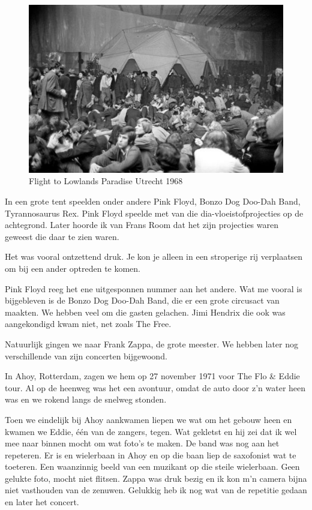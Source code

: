 \documentclass[12pt,twoside, openright]{memoir}
\begin{document}
\begin{figure}
\centering
\includegraphics[width=\textwidth]{img/181-flightutrecht}
\caption*{\footnotesize Flight to Lowlands Paradise Utrecht 1968}
\end{figure}

In een grote tent speelden onder andere Pink Floyd, Bonzo Dog Doo-Dah Band, Tyrannosaurus Rex. Pink Floyd speelde met van die dia-vloeistofprojecties op de achtegrond. Later hoorde ik van Frans Room dat het zijn projecties waren geweest die daar te zien waren.

Het was vooral ontzettend druk. Je kon je alleen in een stroperige rij verplaatsen om bij een ander optreden te komen. 

Pink Floyd reeg het ene uitgesponnen nummer aan het andere. Wat me vooral is bijgebleven is de Bonzo Dog Doo-Dah Band, die er een grote circusact van maakten. We hebben veel om die gasten gelachen. Jimi Hendrix die ook was aangekondigd kwam niet, net zoals The Free.

Natuurlijk gingen we naar Frank Zappa, de grote meester. We hebben later nog verschillende van zijn concerten bijgewoond.

In Ahoy, Rotterdam, zagen we hem op 27 november 1971 voor The Flo \& Eddie tour. Al op de heenweg was het een avontuur, omdat de auto door z’n water heen was en we rokend langs de snelweg stonden. 

Toen we eindelijk bij Ahoy aankwamen liepen we wat om het gebouw heen en kwamen we Eddie, één van de zangers, tegen. Wat gekletst en hij zei dat ik wel mee naar binnen mocht om wat foto's te maken. De band was nog aan het repeteren. Er is en wielerbaan in Ahoy en op die baan liep de saxofonist wat te toeteren. Een waanzinnig beeld van een muzikant op die steile wielerbaan. Geen gelukte foto, mocht niet flitsen. Zappa was druk bezig en ik kon m’n camera bijna niet vasthouden van de zenuwen. Gelukkig heb ik nog wat van de repetitie gedaan en later het concert.
\end{document}
